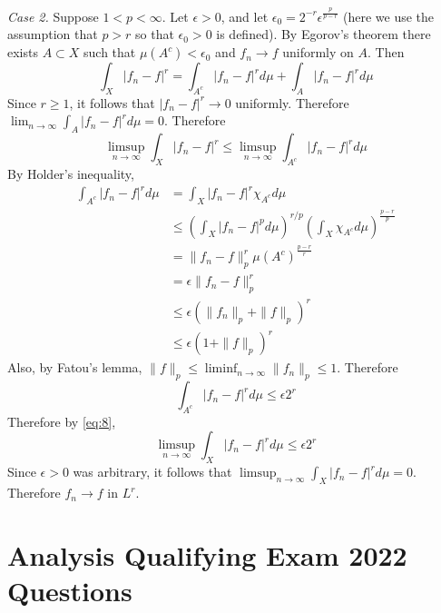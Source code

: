 \documentclass[answers]{exam}
\begin{document}
\begin{questions}
\begin{solution}
  \textit{Case 2.} Suppose $1<p<\infty$. Let $\epsilon>0$, and let $\epsilon_{0} = 2^{-r} \epsilon^{\frac{p}{p-r}}$ (here we use the assumption that $p>r$ so that $\epsilon_{0}>0$ is defined). By Egorov's theorem there exists $A\subset X$ such that $\mu(A^{c})<\epsilon_{0}$ and $f_{n}\to f$ uniformly on $A$. Then
  \begin{equation*}
    \int_{X} |f_{n}-f|^{r} = \int_{A^{c}}|f_{n}-f|^{r}d\mu + \int_{A}|f_{n}-f|^{r}d\mu
  \end{equation*}
  Since $r\geq 1$, it follows that $|f_{n}-f|^{r}\to 0$ uniformly. Therefore $\lim_{n\to\infty }\int_{A}|f_{n}-f|^{r}d\mu =0$. Therefore
  \begin{equation}\label{eq:8}
    \limsup_{n\to\infty} \int_{X} |f_{n}-f|^{r} \leq \limsup_{n\to\infty} \int_{A^{c}}|f_{n}-f|^{r}d\mu
  \end{equation}
  By Holder's inequality,
  \begin{align*}
    \int_{A^{c}}|f_{n}-f|^{r}d\mu
    &= \int_{X} |f_{n}-f|^{r}\chi_{A^{c}} d\mu\\
    &\leq \left( \int_{X}|f_{n}-f|^{p} d\mu\right)^{r/p}\left( \int_{X}\chi_{A^{c}}d\mu  \right)^{\frac{p-r}{p}}\\
    &= \| f_{n}-f \|_{p}^{r}\mu(A^{c})^{\frac{p-r}{r}}\\
    &= \epsilon\| f_{n}-f \|_{p}^{r}\\
    &\leq \epsilon ( \| f_{n} \|_{p}+ \| f \|_{p})^{r}\\
    &\leq \epsilon \left( 1 + \| f \|_{p} \right)^{r}
  \end{align*}
  Also, by Fatou's lemma, $\| f \|_{p}\leq \liminf_{n\to\infty} \| f_{n} \|_{p}\leq 1$. Therefore
  \begin{equation*}
    \int_{A^{c}} | f_{n}-f|^{r}d\mu \leq \epsilon 2^{r}
  \end{equation*}
  Therefore by \eqref{eq:8},
  \begin{equation*}
     \limsup_{n\to\infty} \int_{X} |f_{n}-f|^{r}d\mu  \leq \epsilon 2^{r}
   \end{equation*}
   Since $\epsilon>0$ was arbitrary, it follows that $\limsup_{n\to\infty} \int_{X} |f_{n}-f|^{r}d\mu=0$. Therefore $f_{n}\to f$ in $L^{r}$.
\end{solution}




\newpage
\section{Analysis Qualifying Exam 2022 Questions}


\end{questions}
\end{document}

